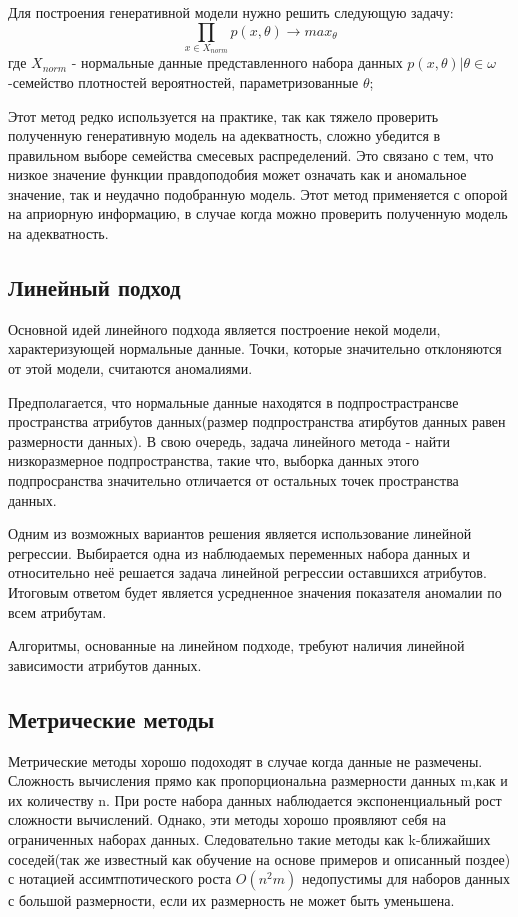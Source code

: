 Для построения генеративной модели нужно решить следующую задачу:
	\begin{equation}
	\prod \limits_{x \in X_{norm}} p(x,\theta)  \rightarrow max_\theta
		\end{equation}
		где $ X_{norm}$ - нормальные данные представленного набора данных ${p(x,\theta)|\theta \in \omega}$ -семейство плотностей вероятностей, параметризованные $\theta$;
		
Этот метод редко используется на практике, так как тяжело проверить полученную генеративную модель на адекватность, сложно  убедится в правильном выборе семейства смесевых распределений. Это связано с тем, что низкое значение функции правдоподобия может означать как и аномальное значение, так и неудачно подобранную модель. Этот метод применяется с опорой на априорную информацию, в случае когда можно проверить полученную модель на адекватность.
\subsection{Линейный подход}
Основной идей линейного подхода является построение некой  модели, характеризующей нормальные данные. Точки, которые значительно отклоняются от этой модели, считаются аномалиями.

Предполагается, что нормальные данные  находятся в подпрострастрансве пространства атрибутов данных(размер подпространства атирбутов данных равен размерности данных). В свою очередь, задача линейного метода - найти низкоразмерное подпространства, такие что, выборка данных этого подпросранства значительно отличается от остальных точек пространства данных.

Одним из возможных вариантов решения является использование линейной регрессии. Выбирается одна из наблюдаемых переменных  набора данных и относительно неё решается задача линейной регрессии оставшихся атрибутов. Итоговым ответом будет является усредненное значения показателя аномалии по всем атрибутам. 

Алгоритмы, основанные на линейном подходе, требуют  наличия линейной зависимости атрибутов данных. 
\subsection{Метрические методы}
Метрические методы хорошо подоходят в случае когда данные не размечены. Сложность вычисления прямо как пропорциональна размерности данных m,как и их количеству n. При росте набора данных наблюдается экспоненциальный рост сложности вычислений. Однако, эти методы хорошо проявляют себя на ограниченных наборах данных\cite{Book7}. Следовательно такие методы как k-ближайших соседей(так же известный как обучение на основе примеров и описанный поздее) с нотацией ассимтпотического роста $O(n^2m)$ недопустимы для наборов данных с большой размерности, если их размерность не может быть уменьшена.

